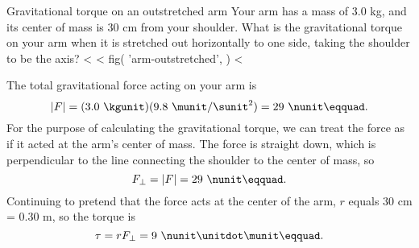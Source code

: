 \begin{eg}{Gravitational torque on an outstretched arm}\label{eg:arm-outstretched}
\egquestion Your arm has a mass of 3.0 kg, and its center of
mass is 30 cm from your shoulder. What is the gravitational
torque on your arm when it is stretched out horizontally to
one side, taking the shoulder to be the axis?
<%
<%
  fig(
    'arm-outstretched',
  )
<%

\eganswer The total gravitational force acting on your arm is
\begin{equation*} 
|F|= (3.0\ \kgunit)(9.8\ \munit/\sunit^2)= 29\ \nunit\eqquad.
\end{equation*}
For the purpose of calculating the gravitational torque, we
can treat the force as if it acted at the arm's center of
mass. The force is straight down, which is perpendicular to
the line connecting the shoulder to the center of mass, so
\begin{equation*}
 F_{\perp} =|F|= 29\ \nunit\eqquad.
\end{equation*}
Continuing to pretend that the force acts at the center of
the arm, $r$ equals 30 cm = 0.30 m, so the torque is
\begin{equation*}
 \tau =r F_{\perp} = 9\ \nunit\unitdot\munit\eqquad.
\end{equation*}
\end{eg}

